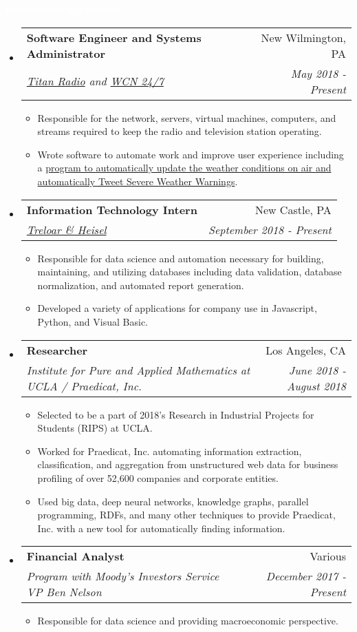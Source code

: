 \documentclass[letterpaper,11pt]{article}
\makeatletter
\newcommand{\resitem}[1]{\item #1 \vspace{-2pt}}
\newcommand{\resheading}[1]{{\large \colorbox{mypurple}{\begin{minipage}{\textwidth}{\textbf{#1 \vphantom{p\^{E}}}}\end{minipage}}}}
\newcommand{\ressubheading}[4]{
	\begin{tabular*}{7.0in}{l@{\extracolsep{\fill}}r}
		\textbf{#1} & #2 \\
		\textit{#3} & \textit{#4} \\
	\end{tabular*}\vspace{-6pt}}
\makeatother
\begin{document}
	\resheading{\textcolor{white}{Professional Experience}}
	\begin{itemize}
	\item
		\ressubheading{Software Engineer and Systems Administrator}{New Wilmington, PA}{\href{http://titanradio.net/}{Titan Radio} and \href{https://www.wcn247.com/}{WCN 24/7}}{May 2018 - Present}
		\begin{itemize}
			\resitem{Responsible for the network, servers, virtual machines, computers, and streams required to keep the radio and television station operating.}
			\resitem{Wrote software to automate work and improve user experience including a \href{https://github.com/alexandermichels/WeatherWaves}{program to automatically update the weather conditions on air and automatically Tweet Severe Weather Warnings}.}
		\end{itemize}
		\item
		\ressubheading{Information Technology Intern}{New Castle, PA}{\href{http://treloaronline.com/}{Treloar \& Heisel}}{September 2018 - Present}
		\begin{itemize}
			\resitem{Responsible for data science and automation necessary for building, maintaining, and utilizing databases including data validation, database normalization, and  automated report generation.}
			\resitem{Developed a variety of applications for company use in Javascript, Python, and Visual Basic.}
		\end{itemize}
		\item
		\ressubheading{Researcher}{Los Angeles, CA}{Institute for Pure and Applied Mathematics at UCLA / Praedicat, Inc.}{June 2018 -August 2018}
		\begin{itemize}
			\resitem{Selected to be a part of 2018’s Research in Industrial Projects for Students (RIPS) at UCLA.}
			\resitem{Worked for Praedicat, Inc. automating information extraction, classification, and aggregation from unstructured web data for business profiling of over 52,600 companies and corporate entities.}
			\resitem{Used big data, deep neural networks, knowledge graphs, parallel programming, RDFs, and many other techniques to provide Praedicat, Inc. with a new tool for automatically finding information.}
		\end{itemize}
		\item
		\ressubheading{Financial Analyst}{Various}{Program with Moody’s Investors Service VP Ben Nelson}{December 2017 - Present}
		\begin{itemize}
			\resitem{Responsible for data science and providing macroeconomic perspective.}

\end{itemize}
\end{itemize}
\end{document}
